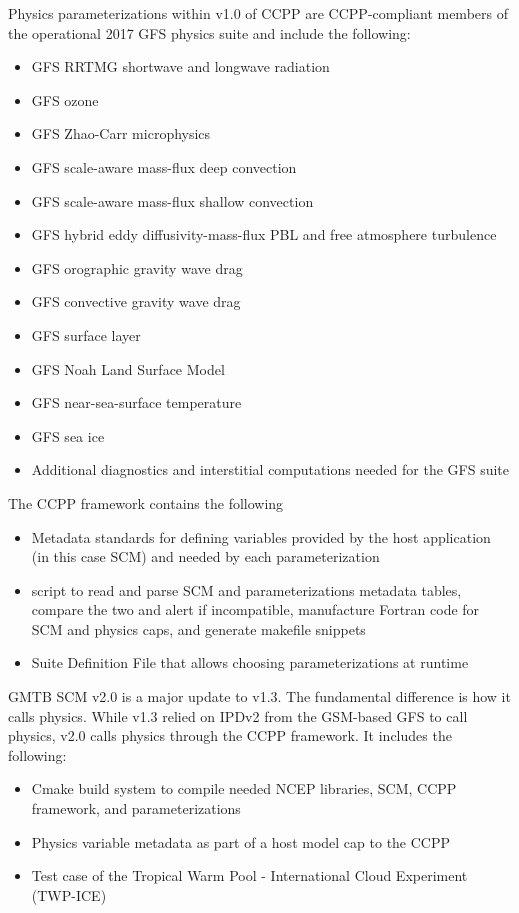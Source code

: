 Physics parameterizations within v1.0 of CCPP are CCPP-compliant members of the operational 2017 GFS physics suite and include the following:
\begin{itemize}
	\item GFS RRTMG shortwave and longwave radiation
	\item GFS ozone
	\item GFS Zhao-Carr microphysics
	\item GFS scale-aware mass-flux deep convection
	\item GFS scale-aware mass-flux shallow convection
	\item GFS hybrid eddy diffusivity-mass-flux PBL and free atmosphere turbulence
	\item GFS orographic gravity wave drag
	\item GFS convective gravity wave drag
	\item GFS surface layer
	\item GFS Noah Land Surface Model
	\item GFS near-sea-surface temperature
	\item GFS sea ice
	\item Additional diagnostics and interstitial computations needed for the GFS suite
\end{itemize}

The CCPP framework contains the following
\begin{itemize}
\item Metadata standards for defining variables provided by the host application (in this case SCM) and needed by each parameterization
\item {} script to read and parse SCM and parameterizations metadata tables, compare the two and alert if incompatible, manufacture Fortran code for SCM and physics caps, and generate makefile snippets
\item Suite Definition File that allows choosing parameterizations at runtime
\end{itemize}

GMTB SCM v2.0 is a major update to v1.3. The fundamental difference is how it calls physics. While v1.3 relied on IPDv2 from the GSM-based GFS to call physics, v2.0 calls physics through the CCPP framework. It includes the following:

\begin{itemize}
\item Cmake build system to compile needed NCEP libraries, SCM, CCPP framework, and parameterizations
\item Physics variable metadata as part of a host model cap to the CCPP
\item Test case of the Tropical Warm Pool - International Cloud Experiment (TWP-ICE)
\end{itemize}

